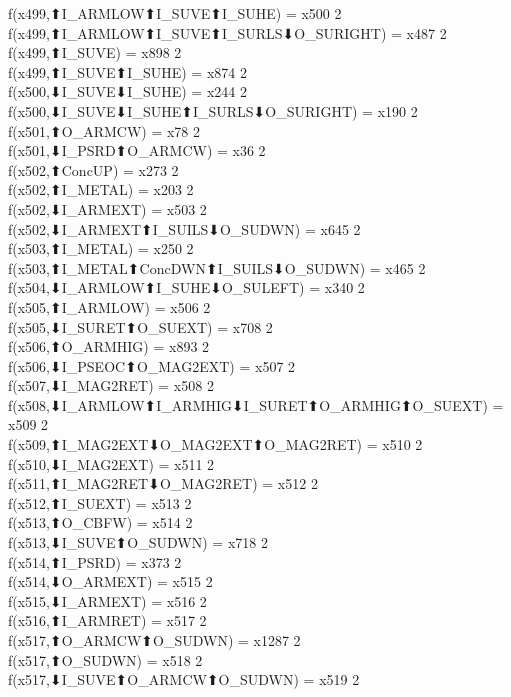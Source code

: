 f(x499,⬆I_ARMLOW⬆I_SUVE⬆I_SUHE) = x500 {2} \\
f(x499,⬆I_ARMLOW⬆I_SUVE⬆I_SURLS⬇O_SURIGHT) = x487 {2} \\
f(x499,⬆I_SUVE) = x898 {2} \\
f(x499,⬆I_SUVE⬆I_SUHE) = x874 {2} \\
f(x500,⬇I_SUVE⬇I_SUHE) = x244 {2} \\
f(x500,⬇I_SUVE⬇I_SUHE⬆I_SURLS⬇O_SURIGHT) = x190 {2} \\
f(x501,⬆O_ARMCW) = x78 {2} \\
f(x501,⬇I_PSRD⬆O_ARMCW) = x36 {2} \\
f(x502,⬆ConcUP) = x273 {2} \\
f(x502,⬆I_METAL) = x203 {2} \\
f(x502,⬇I_ARMEXT) = x503 {2} \\
f(x502,⬇I_ARMEXT⬆I_SUILS⬇O_SUDWN) = x645 {2} \\
f(x503,⬆I_METAL) = x250 {2} \\
f(x503,⬆I_METAL⬆ConcDWN⬆I_SUILS⬇O_SUDWN) = x465 {2} \\
f(x504,⬇I_ARMLOW⬆I_SUHE⬇O_SULEFT) = x340 {2} \\
f(x505,⬆I_ARMLOW) = x506 {2} \\
f(x505,⬇I_SURET⬆O_SUEXT) = x708 {2} \\
f(x506,⬆O_ARMHIG) = x893 {2} \\
f(x506,⬇I_PSEOC⬆O_MAG2EXT) = x507 {2} \\
f(x507,⬇I_MAG2RET) = x508 {2} \\
f(x508,⬇I_ARMLOW⬆I_ARMHIG⬇I_SURET⬆O_ARMHIG⬆O_SUEXT) = x509 {2} \\
f(x509,⬆I_MAG2EXT⬇O_MAG2EXT⬆O_MAG2RET) = x510 {2} \\
f(x510,⬇I_MAG2EXT) = x511 {2} \\
f(x511,⬆I_MAG2RET⬇O_MAG2RET) = x512 {2} \\
f(x512,⬆I_SUEXT) = x513 {2} \\
f(x513,⬆O_CBFW) = x514 {2} \\
f(x513,⬇I_SUVE⬆O_SUDWN) = x718 {2} \\
f(x514,⬆I_PSRD) = x373 {2} \\
f(x514,⬇O_ARMEXT) = x515 {2} \\
f(x515,⬇I_ARMEXT) = x516 {2} \\
f(x516,⬆I_ARMRET) = x517 {2} \\
f(x517,⬆O_ARMCW⬆O_SUDWN) = x1287 {2} \\
f(x517,⬆O_SUDWN) = x518 {2} \\
f(x517,⬇I_SUVE⬆O_ARMCW⬆O_SUDWN) = x519 {2} \\
